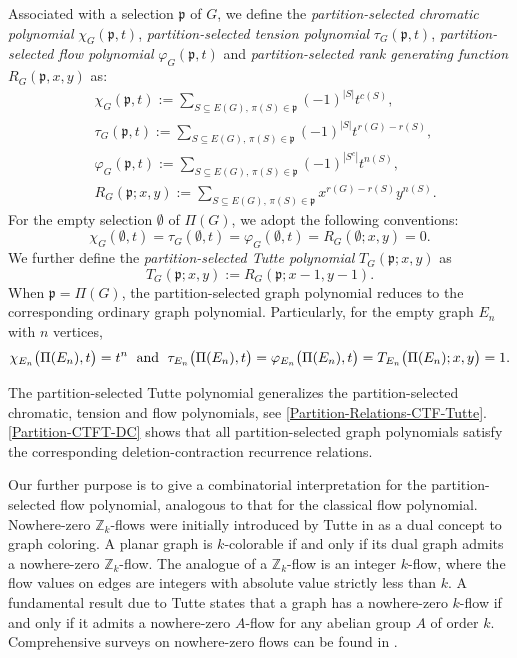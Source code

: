 \documentclass[12pt]{article}%
\numberwithin{equation}{section}
\def\And{\mbox{\rm ~and~}}
\begin{document}
Associated with a selection $\mathfrak{p}$ of $G$, we define the {\em partition-selected chromatic polynomial} $\chi_G(\mathfrak{p},t)$,  {\em partition-selected tension polynomial} $\tau_G(\mathfrak{p},t)$, {\em partition-selected flow polynomial} $\varphi_G(\mathfrak{p},t)$ and {\em partition-selected rank generating function} $R_G(\mathfrak{p},x,y)$ as:
\begin{align}
&\chi_G(\mathfrak{p},t):=\sum_{S\subseteq E(G),\,\pi(S)\in\mathfrak{p}}(-1)^{|S|}t^{c(S)},\label{Partition-Chromatic-Def}\\
&\tau_G(\mathfrak{p},t):=\sum_{S\subseteq E(G),\,\pi(S)\in\mathfrak{p}}(-1)^{|S|}t^{r(G)-r(S)},\label{Partition-Tension-Def}\\
&\varphi_G(\mathfrak{p},t):=\sum_{S\subseteq E(G),\,\pi(S)\in\mathfrak{p}}(-1)^{|S^c|}t^{n(S)},\label{Partition-Flow-Def}\\
&R_G(\mathfrak{p};x,y):=\sum_{S\subseteq E(G),\,\pi(S)\in\mathfrak{p}}x^{r(G)-r(S)}y^{n(S)}\label{Partition-Rank-Def}.
\end{align}
For the empty selection $\emptyset$ of $\Pi(G)$, we adopt the following  conventions:
\[
\chi_G(\emptyset,t)=\tau_G(\emptyset,t)=\varphi_G(\emptyset,t)=R_G(\emptyset;x,y)=0.
\]
We further define the {\em partition-selected Tutte polynomial} $T_G(\mathfrak{p};x,y)$ as 
\begin{equation}\label{Partition-Tutte-Def}
T_G(\mathfrak{p};x,y):=R_G(\mathfrak{p};x-1,y-1).
\end{equation}
When $\mathfrak{p}=\Pi(G)$, the partition-selected graph polynomial reduces to the corresponding ordinary graph polynomial. Particularly, for the empty graph $E_n$ with $n$ vertices, 
\[
\chi_{E_n}\big(\Pi(E_n),t\big)=t^n \;\And\; \tau_{E_n}\big(\Pi(E_n),t\big)=\varphi_{E_n}\big(\Pi(E_n),t\big)=T_{E_n}\big(\Pi(E_n);x,y\big)=1.
\]

The partition-selected Tutte polynomial  generalizes the partition-selected chromatic, tension and flow polynomials, see \autoref{Partition-Relations-CTF-Tutte}. \autoref{Partition-CTFT-DC} shows that all partition-selected graph polynomials satisfy the corresponding deletion-contraction recurrence relations. 

Our further purpose is to give a combinatorial interpretation for the partition-selected flow polynomial, analogous to that for the classical flow polynomial. Nowhere-zero $\mathbb{Z}_k$-flows were initially introduced by Tutte in \cite{Tutte1949,Tutte1954} as a dual concept to graph coloring. A planar graph is $k$-colorable if and only if its dual graph admits a nowhere-zero $\mathbb{Z}_k$-flow. The analogue of a $\mathbb{Z}_k$-flow is an integer $k$-flow, where the flow values on edges are integers with absolute value strictly less than $k$. A fundamental result due to Tutte \cite{Tutte1949} states that a graph has a nowhere-zero $k$-flow if and only if it admits a nowhere-zero $A$-flow for any abelian group $A$ of order $k$. Comprehensive surveys on nowhere-zero flows can be found in \cite{Jaeger1988,Seymour1995}. 
\end{document}
